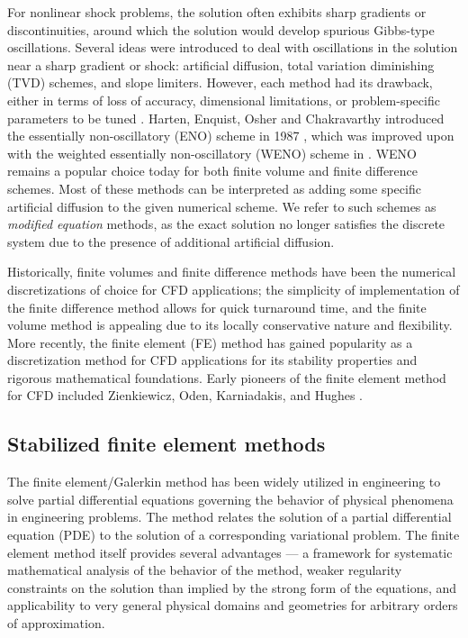 \documentclass{report}
\begin{document}
For nonlinear shock problems, the solution often exhibits sharp gradients or discontinuities, around which the solution would develop spurious Gibbs-type oscillations. Several ideas were introduced to deal with oscillations in the solution near a sharp gradient or shock: artificial diffusion, total variation diminishing (TVD) schemes, and slope limiters. However, each method had its drawback, either in terms of loss of accuracy, dimensional limitations, or problem-specific parameters to be tuned \cite{Shu:Lectures}. Harten, Enquist, Osher and Chakravarthy introduced the essentially non-oscillatory (ENO) scheme in 1987 \cite{ENO}, which was improved upon with the weighted essentially non-oscillatory (WENO) scheme in \cite{WENO}. WENO remains a popular choice today for both finite volume and finite difference schemes. Most of these methods can be interpreted as adding some specific artificial diffusion to the given numerical scheme.  We refer to such schemes as \emph{modified equation} methods, as the exact solution no longer satisfies the discrete system due to the presence of additional artificial diffusion.  

Historically, finite volumes and finite difference methods have been the numerical discretizations of choice for CFD applications; the simplicity of implementation of the finite difference method allows for quick turnaround time, and the finite volume method is appealing due to its locally conservative nature and flexibility. More recently, the finite element (FE) method has gained popularity as a discretization method for CFD applications for its stability properties and rigorous mathematical foundations. Early pioneers of the finite element method for CFD included Zienkiewicz, Oden, Karniadakis, and Hughes \cite{ChungCFDBook}.  

\subsection{Stabilized finite element methods}

The finite element/Galerkin method has been widely utilized in engineering to solve partial differential equations governing the behavior of physical phenomena in engineering problems.  The method relates the solution of a partial differential equation (PDE) to the solution of a corresponding variational problem. The finite element method itself provides several advantages --- a framework for systematic mathematical analysis of the behavior of the method, weaker regularity constraints on the solution than implied by the strong form of the equations, and applicability to very general physical domains and geometries for arbitrary orders of approximation. 
\end{document}
